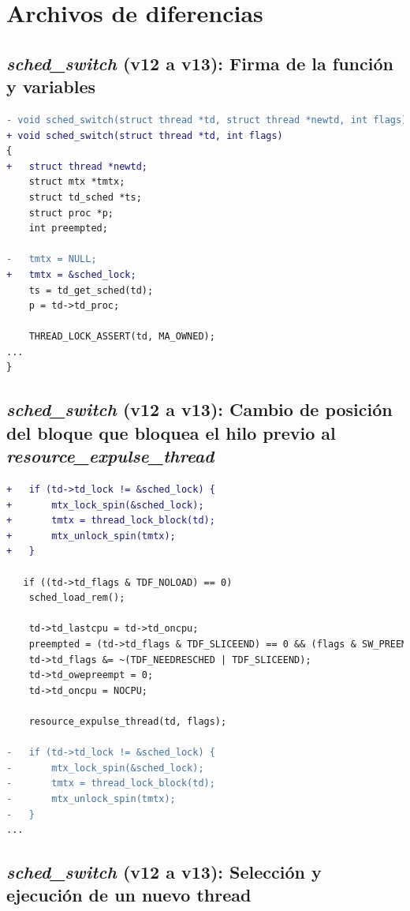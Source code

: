 \appendix

\section{Archivos de diferencias}\label{appendix:apA}

\subsection{\textit{sched\_switch} (v12 a v13): Firma de la función y variables}\label{appendix:apA1}

\begin{lstlisting}[language=diff]
- void sched_switch(struct thread *td, struct thread *newtd, int flags)
+ void sched_switch(struct thread *td, int flags)
{
+   struct thread *newtd;
    struct mtx *tmtx;
    struct td_sched *ts;
    struct proc *p;
    int preempted;

-   tmtx = NULL;
+   tmtx = &sched_lock;
    ts = td_get_sched(td);
    p = td->td_proc;

    THREAD_LOCK_ASSERT(td, MA_OWNED);
...
}
\end{lstlisting}



\subsection{\textit{sched\_switch} (v12 a v13): Cambio de posición del bloque que bloquea el hilo previo al \textit{resource\_expulse\_thread}}\label{appendix:apA2}

\begin{lstlisting}[language=diff]
+   if (td->td_lock != &sched_lock) {
+   	mtx_lock_spin(&sched_lock);
+   	tmtx = thread_lock_block(td);
+   	mtx_unlock_spin(tmtx);
+   }

   if ((td->td_flags & TDF_NOLOAD) == 0)
   	sched_load_rem();

    td->td_lastcpu = td->td_oncpu;
    preempted = (td->td_flags & TDF_SLICEEND) == 0 && (flags & SW_PREEMPT) != 0;
    td->td_flags &= ~(TDF_NEEDRESCHED | TDF_SLICEEND);
    td->td_owepreempt = 0;
    td->td_oncpu = NOCPU;

    resource_expulse_thread(td, flags);

-   if (td->td_lock != &sched_lock) {
-   	mtx_lock_spin(&sched_lock);
-   	tmtx = thread_lock_block(td);
-   	mtx_unlock_spin(tmtx);
-   }
...
\end{lstlisting}


\subsection{\textit{sched\_switch} (v12 a v13): Selección y ejecución de un nuevo thread}\label{appendix:apA3}

